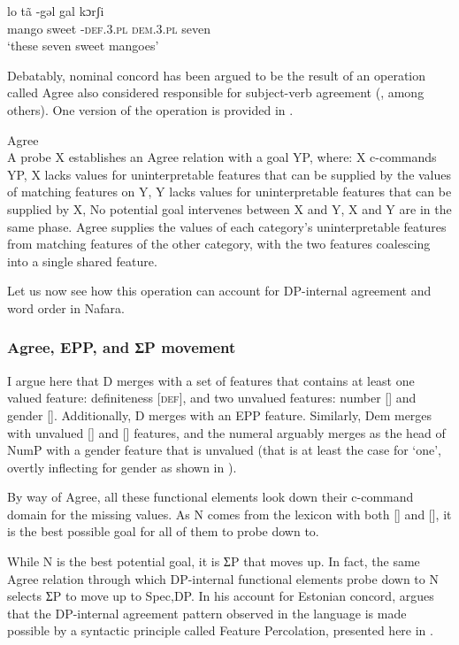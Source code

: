 \documentclass[output=paper]{langscibook}
\begin{document}
\ea\label{ex:baron:17}
\gll lo tã -gəl gal kɔrʃi\\
   mango sweet -\textsc{def.3.pl} \textsc{dem.3.pl} seven\\
\glt ‘these seven sweet mangoes’
\z

Debatably, nominal concord has been argued to be the result of an operation called Agree \parencite{Chomsky2000,Chomsky2001} also considered responsible for subject-verb agreement (\citealt{Baker2008,Carstens2001,Collins2004}, among others). One version of the operation is provided in .


\begin{exe}\ex\label{ex:baron:18}
Agree \citep[26]{Norris2014}\\
A probe X establishes an Agree relation with a goal YP, where:
\xlista
\ex X c-commands YP,
\ex X lacks values for uninterpretable features that can be supplied by the values of  matching features on Y, 
\ex Y lacks values for uninterpretable features that can be supplied by X, 
\ex No potential goal intervenes between X and Y, 
\ex X and Y are in the same phase.
\endxlista
Agree supplies the values of each category’s uninterpretable features from matching features of the other category, with the two features coalescing into a single shared feature.
\end{exe}


Let us now see how this operation can account for DP-internal agreement and word order in Nafara.


\subsubsection{Agree, EPP, and ƩP movement}

I argue here that D merges with a set of features that contains at least one valued feature: definiteness [\textsc{def}], and two unvalued features: number [{\NUM}] and gender [{\GEN}]. Additionally, D merges with an EPP feature. Similarly, Dem merges with unvalued [{\NUM}] and [{\GEN}] features, and the numeral arguably merges as the head of NumP with a gender feature that is unvalued (that is at least the case for ‘one’, overtly inflecting for gender as shown in ).  

By way of Agree, all these functional elements look down their c-command domain for the missing values. As N comes from the lexicon with both [{\NUM}] and [{\GEN}], it is the best possible goal for all of them to probe down to. 

While N is the best potential goal, it is ƩP that moves up. In fact, the same Agree relation through which DP-internal functional elements probe down to N selects ƩP to move up to Spec,DP. In his account for Estonian concord, \citet{Norris2014} argues that the DP-internal agreement pattern observed in the language is made possible by a syntactic principle called Feature Percolation, presented here in .
\end{document}
